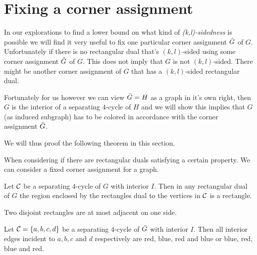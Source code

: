 

\section{Fixing a corner assignment}
  In our explorations to find a lower bound on what kind of \emph{(k,l)-sidedness} is possible we will find it very useful to fix one particular corner assignment $\bar{G}$ of $G$. Unfortunately if there is no rectangular dual that's $(k,l)$-sided using some corner assignment $\bar{G}$ of $G$. This does not imply that $G$ is not $(k,l)$-sided. There might be another corner assignment of $G$ that has a $(k,l)$-sided rectangular dual.

  Fortunately for us however we can view $\bar{G} = H$ as a graph in it's own right, then $G$ is the interior of a separating $4$-cycle of $H$ and we will show this implies that $G$ (as induced subgraph) has to be colored in accordance with the corner assignment $\bar{G}$.

  We will thus proof the following theorem in this section.
  \begin{thrm}
  \label{th:fixCorner assignment}
  When considering if there are rectangular duals satisfying a certain property. We can consider a fixed corner assignment for a graph.
  \end{thrm}

  \begin{remark}
  \label{re:interiorRectangle}
  Let $\mathcal{C}$ be a separating $4$-cycle of $G$ with interior $I$. Then in any rectangular dual of $G$ the region enclosed by the rectangles dual to the vertices in $\mathcal{C}$ is a rectangle.
  \end{remark}

  \begin{remark}
  \label{re:disjointRectanglesOnlyHaveOneAdjecentSide}
  Two disjoint rectangles are at most adjacent on one side.
  \end{remark}

  \begin{lemma}
  \label{lm:fix:fourCycleInteriorColor}
  Let $\mathcal{C} = \left\lbrace {a, b, c, d} \right\rbrace$ be a separating $4$-cycle of $\bar{G}$ with interior $I$. Then all interior edges incident to $a, b, c$ and $d$ respectively are red, blue, red and blue or blue, red, blue and red.
  \end{lemma}

